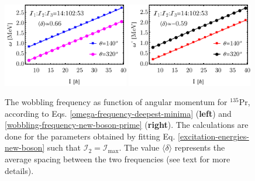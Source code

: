 \begin{figure}
    \centering
    \includegraphics[width=0.49\textwidth]{Chapters/Figures/omega-fit-2.pdf}
    \includegraphics[width=0.49\textwidth]{Chapters/Figures/omega-prime-fit-2.pdf}
    \caption{The wobbling frequency as function of angular momentum for $^{135}$Pr, according to Eqs. \ref{omega-frequency-deepest-minima} (\textbf{left}) and \ref{wobbling-frequency-new-boson-prime} (\textbf{right}). The calculations are done for the parameters obtained by fitting Eq. \ref{excitation-energies-new-boson} such that $\mathcal{I}_2=\mathcal{I}_\text{max}$. The value $\langle\delta\rangle$ represents the average spacing between the two frequencies (see text for more details).}
    \label{wobbling-frequencies-135pr-fit2}
\end{figure}
